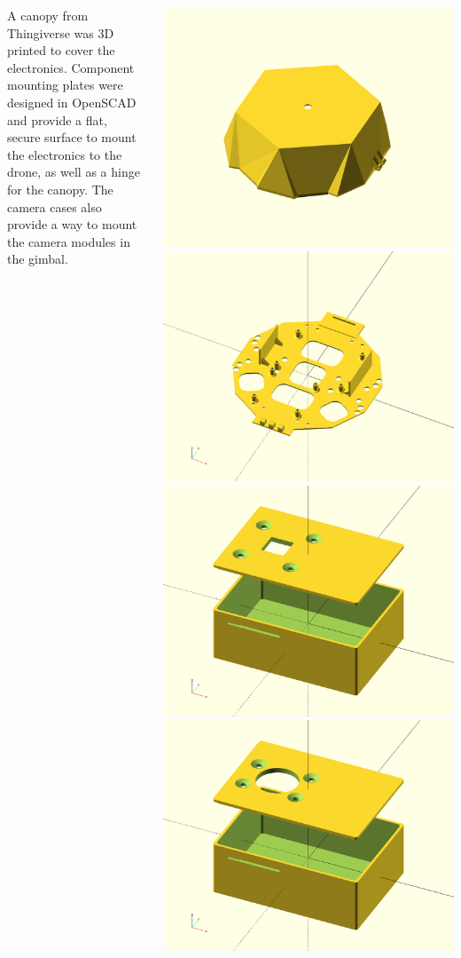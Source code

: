 \documentclass[a1paper, landscape, blockverticalspace=1cm]{tikzposter}
\begin{document}
\begin{columns}
    {
        \normalsize
        A canopy from Thingiverse was 3D printed to cover the electronics.
        Component mounting plates were designed in OpenSCAD and provide a flat, secure surface to mount the electronics to the drone, as well as a hinge for the canopy.
        The camera cases also provide a way to mount the camera modules in the gimbal.

        \begin{tikzfigure}
            \includegraphics[width=0.4\linewidth]{canopy.png}
            \includegraphics[width=0.4\linewidth]{component_mounting_plate}
            \includegraphics[width=0.4\linewidth]{coral_case.png}
            \includegraphics[width=0.4\linewidth]{nano_case.png}
        \end{tikzfigure}
    }


\end{columns}
\end{document}
